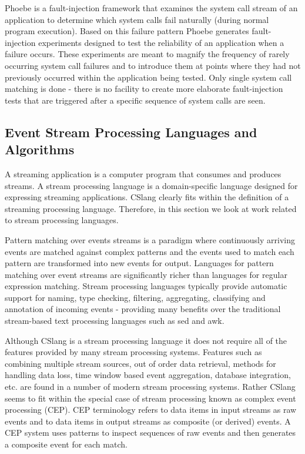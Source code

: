 Phoebe\cite{DBLP:journals/corr/abs-2006-04444} is a fault-injection framework that examines
the system call stream of an application to determine which system calls fail
naturally (during normal program execution). Based on this failure pattern
Phoebe generates fault-injection experiments designed to test the reliability of
an application when a failure occurs. These experiments are meant to magnify the
frequency of rarely occurring system call failures and to introduce them at
points where they had not previously occurred within the application being
tested. Only single system call matching is done - there is no facility to create
more elaborate fault-injection tests that are triggered after a specific
sequence of system calls are seen.

\subsection{Event Stream Processing Languages and Algorithms}

A streaming application is a computer program that consumes and
produces streams. A stream processing language is a domain-specific language
designed for expressing streaming applications\cite{DBLP:journals/sigmod/HirzelBBVSV18}. CSlang clearly
fits within the definition of a streaming processing language. Therefore, in this
section we look at work related to stream processing languages.

Pattern matching
over events streams is a paradigm where continuously arriving events are matched
against complex patterns and the events used to match each pattern are
transformed into new events for output. Languages for pattern matching over event
streams are significantly richer than languages for regular expression
matching\cite{DBLP:conf/sigmod/AgrawalDGI08}. Stream processing languages typically provide automatic
support for naming, type checking, filtering, aggregating, classifying and
annotation of incoming events - providing many benefits over the traditional
stream-based text processing languages such as sed\cite{Mcmahon1979sed} and
awk\cite{DBLP:journals/spe/AhoKW79}.

Although CSlang is a stream processing language it does not
require all of the features provided by many stream processing systems. Features
such as combining multiple stream sources, out of order data retrieval, methods
for handling data loss, time window based event aggregation, database
integration, etc. are found in a number of modern stream processing
systems\cite{DBLP:journals/csur/DayarathnaP18}.   Rather CSlang seems to fit within the special case of
stream processing known as complex event processing (CEP). CEP terminology refers
to data items in input streams as raw events and to data items in output streams
as composite (or derived) events. A CEP system uses patterns to inspect
sequences of raw events and then generates a composite event for each
match\cite{DBLP:journals/ibmrd/HirzelAGJKKMNSSW13}.

